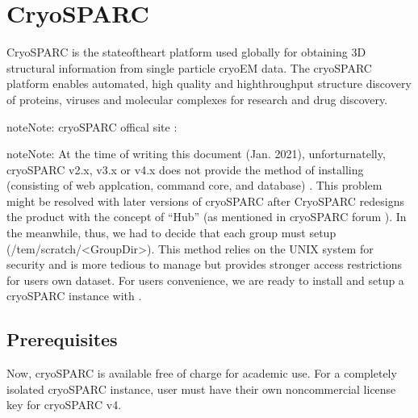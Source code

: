 \documentclass[a4paper,11pt,english]{sphinxmanual}
\begin{document}
\sphinxstepscope


\chapter{CryoSPARC}
\label{\detokenize{cryoSPARC:cryosparc}}\label{\detokenize{cryoSPARC::doc}}
\sphinxAtStartPar
CryoSPARC is the state\sphinxhyphen{}of\sphinxhyphen{}the\sphinxhyphen{}art platform used globally for obtaining 3D structural information from single particle cryo\sphinxhyphen{}EM data.
The cryoSPARC platform enables automated, high quality and high\sphinxhyphen{}throughput structure discovery of proteins, viruses and molecular complexes
for research and drug discovery.

\begin{sphinxadmonition}{note}{Note:}
\sphinxAtStartPar
cryoSPARC offical site : 
\end{sphinxadmonition}

\begin{sphinxadmonition}{note}{Note:}
\sphinxAtStartPar
At the time of writing this document (Jan. 2021), unforturnatelly, cryoSPARC v2.x, v3.x or v4.x does not provide the method of installing 
(consisting of web applcation, command core, and database) .
This problem might be resolved with later versions of cryoSPARC after CryoSPARC re\sphinxhyphen{}designs the product with the concept of “Hub” (as mentioned in cryoSPARC forum
).
In the meanwhile, thus, we had to decide that each group must setup 
(/tem/scratch/<GroupDir>).
This method relies on the UNIX system for security and is more tedious to manage but provides stronger access restrictions for users own dataset.
For users convenience, we are ready to install and setup a cryoSPARC instance with .
\end{sphinxadmonition}


\section{Prerequisites}
\label{\detokenize{cryoSPARC:prerequisites}}
\sphinxAtStartPar
Now, cryoSPARC is available free of charge for academic use. For a completely isolated cryoSPARC instance, user must have their own non\sphinxhyphen{}commercial license key for cryoSPARC v4.
\end{document}
